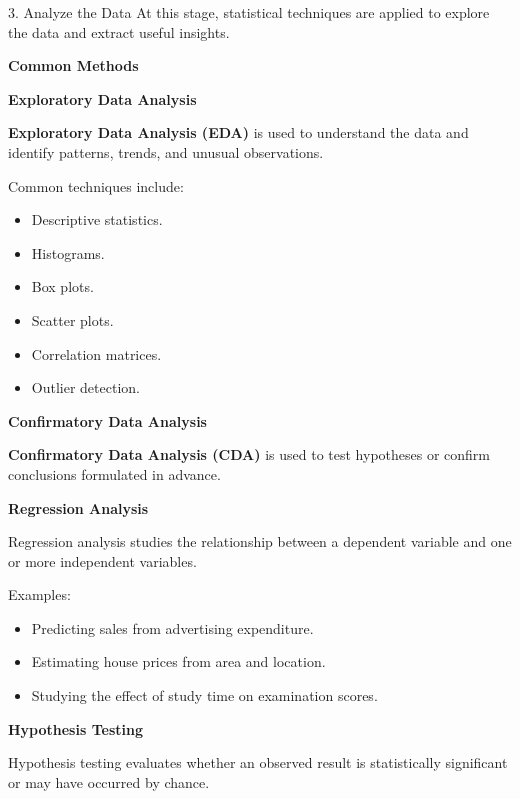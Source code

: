 \documentclass[aspectratio=169,11pt]{beamer}
\begin{document}
\begin{frame}[allowframebreaks]{3. Analyze the Data}
\footnotesize
At this stage, statistical techniques are applied to explore the data and extract useful insights.\par\medskip
\textbf{Common Methods}\par\medskip
\textbf{Exploratory Data Analysis}\par\medskip
\textbf{Exploratory Data Analysis (EDA)} is used to understand the data and identify patterns, trends, and unusual observations.\par\medskip
Common techniques include:\par\medskip
\begin{itemize}
\item Descriptive statistics.
\item Histograms.
\item Box plots.
\item Scatter plots.
\item Correlation matrices.
\item Outlier detection.
\end{itemize}
\textbf{Confirmatory Data Analysis}\par\medskip
\textbf{Confirmatory Data Analysis (CDA)} is used to test hypotheses or confirm conclusions formulated in advance.\par\medskip
\textbf{Regression Analysis}\par\medskip
Regression analysis studies the relationship between a dependent variable and one or more independent variables.\par\medskip
Examples:\par\medskip
\begin{itemize}
\item Predicting sales from advertising expenditure.
\item Estimating house prices from area and location.
\item Studying the effect of study time on examination scores.
\end{itemize}
\textbf{Hypothesis Testing}\par\medskip
Hypothesis testing evaluates whether an observed result is statistically significant or may have occurred by chance.\par\medskip
\end{frame}
\end{document}
